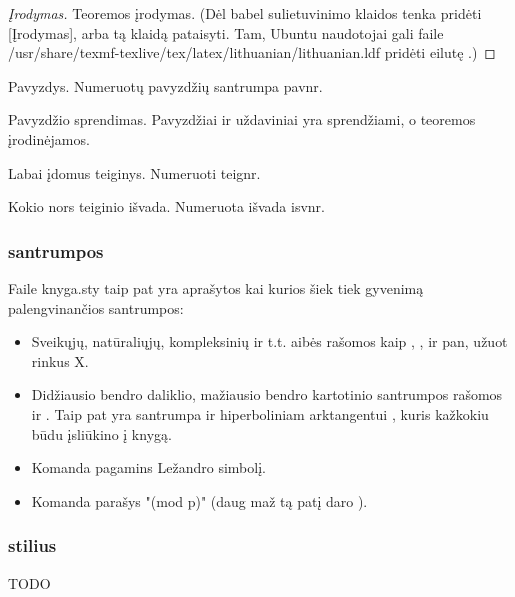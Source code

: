 \begin{proof}[Įrodymas]
Teoremos įrodymas. (Dėl babel sulietuvinimo klaidos tenka pridėti [Įrodymas],
arba tą klaidą pataisyti. Tam, Ubuntu naudotojai gali faile
/usr/share/texmf-texlive/tex/latex/lithuanian/lithuanian.ldf pridėti eilutę
\def\proofname{\k{I}rodymas}.)
\end{proof}

\begin{pav}
Pavyzdys. Numeruotų pavyzdžių santrumpa pavnr.
\end{pav}

\begin{sprendimas}
Pavyzdžio sprendimas. Pavyzdžiai ir uždaviniai yra sprendžiami, o teoremos įrodinėjamos.
\end{sprendimas}

\begin{teig}
Labai įdomus teiginys. Numeruoti teignr.
\end{teig}

\begin{isv}
Kokio nors teiginio išvada. Numeruota išvada isvnr.
\end{isv}

\subsubsection{santrumpos}

Faile knyga.sty taip pat yra aprašytos kai kurios šiek tiek gyvenimą
palengvinančios santrumpos:

\begin{itemize}
\item Sveikųjų, natūraliųjų, kompleksinių ir t.t. aibės rašomos kaip \Z, \N, \C
ir pan, užuot rinkus {\mathbb X}.
\item Didžiausio bendro daliklio, mažiausio bendro kartotinio santrumpos
rašomos \dbd ir \mbk. Taip pat yra santrumpa ir hiperboliniam arktangentui
\arctanh, kuris kažkokiu būdu įsliūkino į knygą.
\item Komanda  pagamins Ležandro simbolį.
\item Komanda  parašys "(mod p)" (daug maž tą patį daro ).
\end{itemize}

\subsubsection{stilius}

TODO

